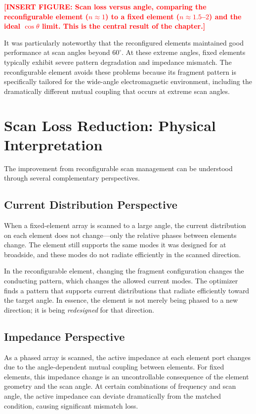 \textcolor{red}{\textbf{[INSERT FIGURE: Scan loss versus angle, comparing the reconfigurable element ($n \approx 1$) to a fixed element ($n \approx 1.5$--$2$) and the ideal $\cos\theta$ limit.  This is the central result of the chapter.]}}

It was particularly noteworthy that the reconfigured elements maintained good performance at scan angles beyond $60^{\circ}$.  At these extreme angles, fixed elements typically exhibit severe pattern degradation and impedance mismatch.  The reconfigurable element avoids these problems because its fragment pattern is specifically tailored for the wide-angle electromagnetic environment, including the dramatically different mutual coupling that occurs at extreme scan angles.

\section{Scan Loss Reduction: Physical Interpretation}

The improvement from reconfigurable scan management can be understood through several complementary perspectives.

\subsection{Current Distribution Perspective}

When a fixed-element array is scanned to a large angle, the current distribution on each element does not change---only the relative phases between elements change.  The element still supports the same modes it was designed for at broadside, and these modes do not radiate efficiently in the scanned direction.

In the reconfigurable element, changing the fragment configuration changes the conducting pattern, which changes the allowed current modes.  The optimizer finds a pattern that supports current distributions that radiate efficiently toward the target angle.  In essence, the element is not merely being phased to a new direction; it is being \emph{redesigned} for that direction.

\subsection{Impedance Perspective}

As a phased array is scanned, the active impedance at each element port changes due to the angle-dependent mutual coupling between elements.  For fixed elements, this impedance change is an uncontrollable consequence of the element geometry and the scan angle.  At certain combinations of frequency and scan angle, the active impedance can deviate dramatically from the matched condition, causing significant mismatch loss.

